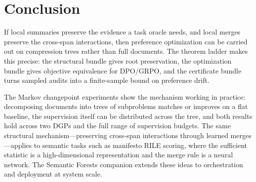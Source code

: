 \section{Conclusion}\label{sec:conclusion}

If local summaries preserve the evidence a task oracle needs, and local merges preserve the cross-span interactions, then preference optimization can be carried out on compression trees rather than full documents. The theorem ladder makes this precise: the structural bundle gives root preservation, the optimization bundle gives objective equivalence for DPO/GRPO, and the certificate bundle turns sampled audits into a finite-sample bound on preference drift.

The Markov changepoint experiments show the mechanism working in practice: decomposing documents into trees of subproblems matches or improves on a flat baseline, the supervision itself can be distributed across the tree, and both results hold across two DGPs and the full range of supervision budgets. The same structural mechanism---preserving cross-span interactions through learned merges---applies to semantic tasks such as manifesto RILE scoring, where the sufficient statistic is a high-dimensional representation and the merge rule is a neural network. The Semantic Forests companion extends these ideas to orchestration and deployment at system scale.
